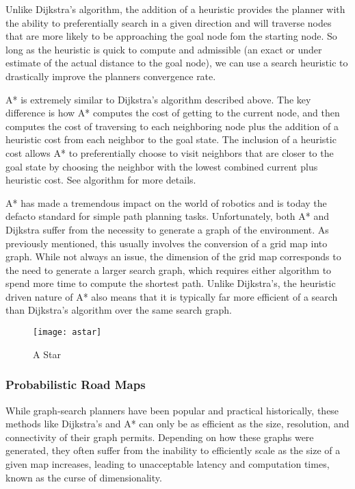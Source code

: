 Unlike Dijkstra's algorithm, the addition of a heuristic provides the planner with the ability to preferentially search in a given direction and will traverse nodes that are more likely to be approaching the goal node fom the starting node. So long as the heuristic is quick to compute and admissible (an exact or under estimate of the actual distance to the goal node), we can use a search heuristic to drastically improve the planners convergence rate.

A* is extremely similar to Dijkstra's algorithm described above. The key difference is how A* computes the cost of getting to the current node, and then computes the cost of traversing to each neighboring node plus the addition of a heuristic cost from each neighbor to the goal state. The inclusion of a heuristic cost allows A* to preferentially choose to visit neighbors that are closer to the goal state by choosing the neighbor with the lowest combined current plus heuristic cost. See algorithm for more details.



A* has made a tremendous impact on the world of robotics and is today the defacto standard for simple path planning tasks. Unfortunately, both A* and Dijkstra suffer from the necessity to generate a graph of the environment. As previously mentioned, this usually involves the conversion of a grid map into graph. While not always an issue, the dimension of the grid map corresponds to the need to generate a larger search graph, which requires either algorithm to spend more time to compute the shortest path. Unlike Dijkstra's, the heuristic driven nature of A* also means that it is typically far more efficient of a search than Dijkstra's algorithm over the same search graph. 


\begin{figure}[h!]
    \texttt{[image: astar]}
    \centering
    \label{fig:Astar}
    \caption{A Star}
  \end{figure}

\subsubsection{Probabilistic Road Maps}

While graph-search planners have been popular and practical historically, these methods like Dijkstra's and A* can only be as efficient as the size, resolution, and connectivity of their graph permits. Depending on how these graphs were generated, they often suffer from the inability to efficiently scale as the size of a given map increases, leading to unacceptable latency and computation times, known as the curse of dimensionality.

